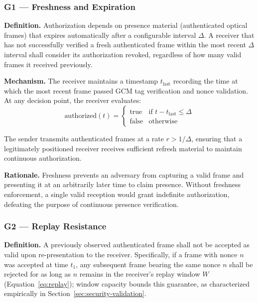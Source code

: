\documentclass[conference]{IEEEtran}
\begin{document}
\subsubsection{G1 — Freshness and Expiration}

\textbf{Definition.} Authorization depends on presence material (authenticated optical frames) that expires automatically after a configurable interval $\Delta$. A receiver that has not successfully verified a fresh authenticated frame within the most recent $\Delta$ interval shall consider its authorization revoked, regardless of how many valid frames it received previously.

\textbf{Mechanism.} The receiver maintains a timestamp $t_{\text{last}}$ recording the time at which the most recent frame passed GCM tag verification and nonce validation. At any decision point, the receiver evaluates:
\begin{equation}
\text{authorized}(t) = 
\begin{cases}
\text{true} & \text{if } t - t_{\text{last}} \leq \Delta \\
\text{false} & \text{otherwise}
\end{cases}
\label{eq:freshness}
\end{equation}

\noindent The sender transmits authenticated frames at a rate $r > 1/\Delta$, ensuring that a legitimately positioned receiver receives sufficient refresh material to maintain continuous authorization.

\textbf{Rationale.} Freshness prevents an adversary from capturing a valid frame and presenting it at an arbitrarily later time to claim presence. Without freshness enforcement, a single valid reception would grant indefinite authorization, defeating the purpose of continuous presence verification.

\subsubsection{G2 — Replay Resistance}

\textbf{Definition.} A previously observed authenticated frame shall not be accepted as valid upon re-presentation to the receiver. Specifically, if a frame with nonce $n$ was accepted at time $t_1$, any subsequent frame bearing the same nonce $n$ shall be rejected for as long as $n$ remains in the receiver's replay window $W$ (Equation~\eqref{eq:replay}); window capacity bounds this guarantee, as characterized empirically in Section~\ref{sec:security-validation}.
\end{document}
